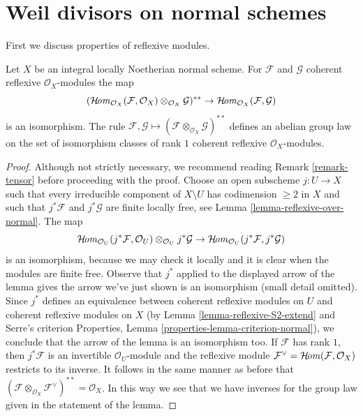 \section{Weil divisors on normal schemes}
\label{section-weil-divisors-normal}

\noindent
First we discuss properties of reflexive modules.

\begin{lemma}
\label{lemma-reflexive-normal}
Let $X$ be an integral locally Noetherian normal scheme.
For $\mathcal{F}$ and $\mathcal{G}$ coherent reflexive
$\mathcal{O}_X$-modules the map
$$
(\mathop{\mathcal{H}\!\mathit{om}}\nolimits_{\mathcal{O}_X}(\mathcal{F}, \mathcal{O}_X)
\otimes_{\mathcal{O}_X} \mathcal{G})^{**} \to
\mathop{\mathcal{H}\!\mathit{om}}\nolimits_{\mathcal{O}_X}(\mathcal{F}, \mathcal{G})
$$
is an isomorphism. The rule $\mathcal{F}, \mathcal{G} \mapsto
(\mathcal{F} \otimes_{\mathcal{O}_X} \mathcal{G})^{**}$
defines an abelian group law on the set of isomorphism classes of rank $1$
coherent reflexive $\mathcal{O}_X$-modules.
\end{lemma}

\begin{proof}
Although not strictly necessary, we recommend reading
Remark \ref{remark-tensor} before proceeding with the proof.
Choose an open subscheme $j : U \to X$ such that
every irreducible component of $X \setminus U$ has codimension $\geq 2$
in $X$ and such that $j^*\mathcal{F}$ and $j^*\mathcal{G}$ are finite
locally free, see Lemma \ref{lemma-reflexive-over-normal}.
The map
$$
\mathop{\mathcal{H}\!\mathit{om}}\nolimits_{\mathcal{O}_U}(j^*\mathcal{F}, \mathcal{O}_U)
\otimes_{\mathcal{O}_U} j^*\mathcal{G} \to
\mathop{\mathcal{H}\!\mathit{om}}\nolimits_{\mathcal{O}_U}(j^*\mathcal{F}, j^*\mathcal{G})
$$
is an isomorphism, because we may check it locally and it is
clear when the modules are finite free. Observe that $j^*$
applied to the displayed arrow of the lemma gives the arrow
we've just shown is an isomorphism (small detail omitted).
Since $j^*$ defines an equivalence between coherent reflexive modules on $U$
and coherent reflexive modules on $X$
(by Lemma \ref{lemma-reflexive-S2-extend} and Serre's criterion
Properties, Lemma \ref{properties-lemma-criterion-normal}),
we conclude that the arrow of the lemma is an isomorphism too.
If $\mathcal{F}$ has rank $1$, then $j^*\mathcal{F}$
is an invertible $\mathcal{O}_U$-module and the reflexive module
$\mathcal{F}^\vee = \mathop{\mathcal{H}\!\mathit{om}}\nolimits(\mathcal{F}, \mathcal{O}_X)$
restricts to its inverse. It follows in the same manner as before that
$(\mathcal{F} \otimes_{\mathcal{O}_X} \mathcal{F}^\vee)^{**} = \mathcal{O}_X$.
In this way we see that we have inverses for the group law
given in the statement of the lemma.
\end{proof}

